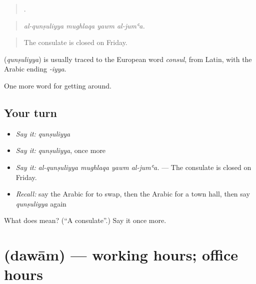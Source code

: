 \begin{quote}
   .
\end{quote}

\begin{quote}
\emph{al-qunṣuliyya mughlaqa yawm al-jumʿa.}
\end{quote}

\begin{quote}
The consulate is closed on Friday.
\end{quote}

\begin{cousinweb}
\textbf{} (\emph{qunṣuliyya}) is usually traced to the European word \emph{consul}, from Latin, with the Arabic ending \emph{-iyya}.
\end{cousinweb}

\begin{grammarlens}[title={What you've built}]
One more word for getting around.
\end{grammarlens}

\subsection*{Your turn}
\begin{itemize}
\raggedright
  \item \emph{Say it:} \emph{qunṣuliyya}
  \item \emph{Say it:} \emph{qunṣuliyya}, once more
  \item \emph{Say it:} \emph{al-qunṣuliyya mughlaqa yawm al-jumʿa.} — The consulate is closed on Friday.
  \item \emph{Recall:} say the Arabic for to swap, then the Arabic for a town hall, then say \emph{qunṣuliyya} again
\end{itemize}

\begin{tcolorbox}[breakable,colback=teal!4,colframe=teal!35!black,title={Before you move on}]
What does  mean? (\textquotedblleft{}A consulate\textquotedblright{}.) Say it once more.
\end{tcolorbox}
\section[\texorpdfstring{\ar{دوام} (dawām)}{دوام (dawām)}]{ (dawām) — working hours; office hours}

\label{lesson:AR-C450-dawam}



